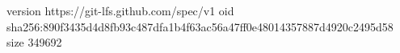 version https://git-lfs.github.com/spec/v1
oid sha256:890f3435d4d8fb93c487dfa1b4f63ac56a47ff0e48014357887d4920c2495d58
size 349692

